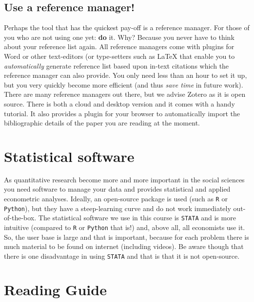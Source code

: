 \documentclass[
]{book}
\begin{document}
\hypertarget{use-a-reference-manager}{%
\subsection{Use a reference manager!}\label{use-a-reference-manager}}

Perhaps the tool that has the quickest pay-off is a reference manager. For those of you who are not using one yet: \textbf{do} it. Why? Because you never have to think about your reference list again. All reference managers come with plugins for Word or other text-editors (or type-setters such as LaTeX that enable you to \emph{automatically} generate reference list based upon in-text citations which the reference manager can also provide. You only need less than an hour to set it up, but you very quickly become more efficient (and thus \emph{save time} in future work). There are many reference managers out there, but we advise Zotero as it is open source. There is both a cloud and desktop version and it comes with a handy tutorial. It also provides a plugin for your browser to automatically import the bibliographic details of the paper you are reading at the moment.

\hypertarget{statistical-software}{%
\section{Statistical software}\label{statistical-software}}

As quantitative research become more and more important in the social sciences you need software to manage your data and provides statistical and applied econometric analyses. Ideally, an open-source package is used (such as \texttt{R} or \texttt{Python}), but they have a steep-learning curve and do not work immediately out-of-the-box. The statistical software we use in this course is \texttt{STATA} and is more intuitive (compared to \texttt{R} or \texttt{Python} that is!) and, above all, all economists use it. So, the user base is large and that is important, because for each problem there is much material to be found on internet (including videos). Be aware though that there is one disadvantage in using \texttt{STATA} and that is that it is not open-source.

\hypertarget{reading-guide}{%
\section{Reading Guide}\label{reading-guide}}
\end{document}
